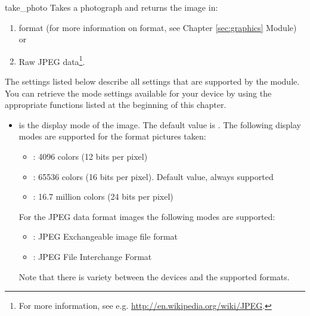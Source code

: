 \begin{funcdesc}{take_photo}{}
Takes a photograph and returns the image in:

\begin{enumerate}
  \item {} format (for more information on  format, see 
  Chapter \ref{sec:graphics}  Module) or
  
  \item Raw JPEG data\footnote{For more information, see e.g. 
  \url{http://en.wikipedia.org/wiki/JPEG}.}. 
\end{enumerate}

The settings listed below describe all settings that are supported by the 
 module. You can retrieve the mode settings available for your 
device by using the appropriate functions listed at the beginning of this 
chapter.

\begin{itemize}

\item {} is the display mode of the image. The default value is 
. The following display modes are supported for the  
format pictures taken:
	\begin{itemize}
	\item {}: 4096 colors (12 bits per pixel)
	\item {}: 65536 colors (16 bits per pixel). Default value, always supported
	\item {}: 16.7 million colors (24 bits per pixel)
	\end{itemize}

For the JPEG data format images the following modes are supported:

	\begin{itemize}
	\item {}: JPEG Exchangeable image file format
	\item {}: JPEG File Interchange Format
	\end{itemize}

Note that there is variety between the devices and the supported formats.


\end{itemize}
\end{funcdesc}
